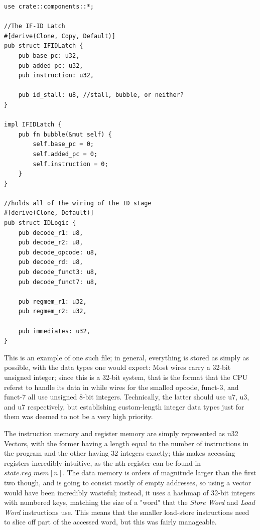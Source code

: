 \documentclass[12pt,twoside]{reedthesis}
\begin{document}
\begin{lstlisting}[caption={$decode.rs$, the file that holds ID-stage structs}]
use crate::components::*;

//The IF-ID Latch
#[derive(Clone, Copy, Default)]
pub struct IFIDLatch {
    pub base_pc: u32,
    pub added_pc: u32,
    pub instruction: u32,

    pub id_stall: u8, //stall, bubble, or neither?
}

impl IFIDLatch {
    pub fn bubble(&mut self) {
        self.base_pc = 0;
        self.added_pc = 0;
        self.instruction = 0;
    }
}

//holds all of the wiring of the ID stage
#[derive(Clone, Default)]
pub struct IDLogic {
    pub decode_r1: u8,
    pub decode_r2: u8,
    pub decode_opcode: u8,
    pub decode_rd: u8,
    pub decode_funct3: u8,
    pub decode_funct7: u8,

    pub regmem_r1: u32,
    pub regmem_r2: u32,

    pub immediates: u32,
}
\end{lstlisting}

This is an example of one such file; in general, everything is stored as simply as possible, with the data types one would expect: Most wires carry a 32-bit unsigned integer; since this is a 32-bit system, that is the format that the CPU referst to handle its data in while wires for the smalled opcode, funct-3, and funct-7 all use unsigned 8-bit integers. Technically, the latter should use u7, u3, and u7 respectively, but establishing custom-length integer data types just for them was deemed to not be a very high priority.

The instruction memory and register memory are simply represented as u32 Vectors, with the former having a length equal to the number of instructions in the program and the other having 32 integers exactly; this makes accessing registers incredibly intuitive, as the nth register can be found in $state.reg\_mem[n]$. The data memory is orders of magnitude larger than the first two though, and is going to consist mostly of empty addresses, so using a vector would have been incredibly wasteful; instead, it uses a hashmap of 32-bit integers with numbered keys, matching the size of a "word" that the \textit{Store Word} and \textit{Load Word} instructions use. This means that the smaller load-store instructions need to slice off part of the accessed word, but this was fairly manageable.
\end{document}
